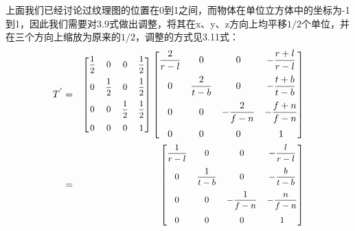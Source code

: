 上面我们已经讨论过纹理图的位置在0到1之间，而物体在单位立方体中的坐标为-1到1，因此我们需要对3.9式做出调整，将其在x、y、z方向上均平移$1/2$个单位，并在三个方向上缩放为原来的$1/2$，调整的方式见3.11式：
\begin{eqnarray}       %
  T^{'}& = &
\begin{small}
\begin{bmatrix}
\vspace{0.2cm}
    \displaystyle\frac{1}{2} & 0 & 0 & \displaystyle\frac{1}{2}\\  %
\vspace{0.2cm}
    0 & \displaystyle\frac{1}{2} & 0 & \displaystyle\frac{1}{2}\\  %
\vspace{0.2cm}
    0 & 0 & \displaystyle\frac{1}{2} & \displaystyle\frac{1}{2}\\  %
    0 & 0 & 0 & 1\\%
\end{bmatrix}
\end{small}
\begin{bmatrix}
\vspace{0.2cm}
    \displaystyle\frac{2}{r-l} & 0 & 0 & \displaystyle-\frac{r+l}{r-l}\\  %
\vspace{0.2cm}
    0 & \displaystyle\frac{2}{t-b} & 0 & \displaystyle-\frac{t+b}{t-b}\\  %
\vspace{0.2cm}
    0 & 0 & \displaystyle-\frac{2}{f-n} & \displaystyle-\frac{f+n}{f-n}\\  %
    0 & 0 & 0 & \displaystyle1\\%
\end{bmatrix}  \notag \\
&= & 
\begin{small}
\begin{bmatrix}
\vspace{0.2cm}
    \displaystyle\frac{1}{r-l} & 0 & 0 & \displaystyle-\frac{l}{r-l}\\  %
\vspace{0.2cm}
    0 & \displaystyle\frac{1}{t-b} & 0 & \displaystyle-\frac{b}{t-b}\\  %
\vspace{0.2cm}
    0 & 0 & \displaystyle-\frac{1}{f-n} & \displaystyle-\frac{n}{f-n}\\  %
    0 & 0 & 0 & \displaystyle1\\%
\end{bmatrix} 
\end{small}
\end{eqnarray}

